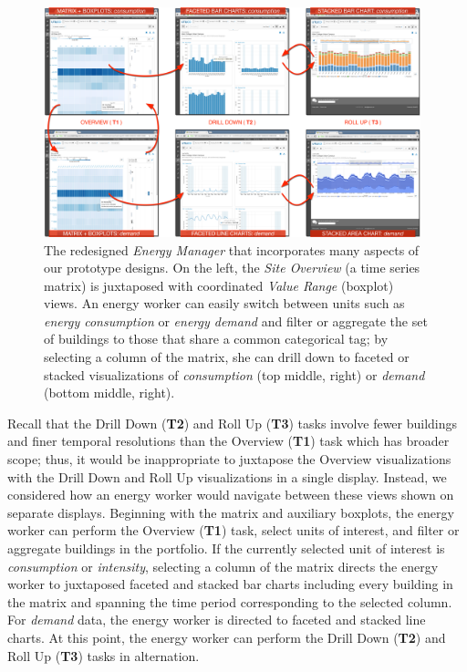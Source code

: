\documentclass[journal]{vgtc}                %
\newcommand{\bstart}[1]{\vspace{1mm} \noindent{\textbf{#1:}}}
\begin{document}
\begin{figure}[hbp!]
    \vspace{-0.45cm}
	\centering
	\includegraphics[width=0.975\textwidth]{figures/emu.pdf}
	\vspace{-0.3cm}
	\caption{The redesigned \textsl{Energy Manager} that incorporates many aspects of our prototype designs. On the left, the \textsl{Site Overview} (a time series matrix) is juxtaposed with coordinated \textsl{Value Range} (boxplot) views. An energy worker can easily switch between units such as \textsl{energy consumption} or \textsl{energy demand} and filter or aggregate the set of buildings to those that share a common categorical tag; by selecting a column of the matrix, she can drill down to faceted or stacked visualizations of \textsl{consumption} (top middle, right) or \textsl{demand} (bottom middle, right).}
	\label{fig:emu}
\end{figure} 

\bstart{Sequenced view navigation}
Recall that the Drill Down ({\bf T2}) and Roll Up ({\bf T3}) tasks involve fewer buildings and finer temporal resolutions than the Overview ({\bf T1}) task which has broader scope; 
thus, it would be inappropriate to juxtapose the Overview visualizations with the Drill Down and Roll Up  visualizations in a single display.
Instead, we considered how an energy worker would navigate between these views shown on separate displays.
Beginning with the matrix and auxiliary boxplots, the energy worker can perform the Overview ({\bf T1}) task, select units of interest, and filter or aggregate buildings in the portfolio. 
If the currently selected unit of interest is {\it consumption} or {\it intensity}, selecting a column of the matrix directs the energy worker to juxtaposed faceted and stacked bar charts including every building in the matrix and spanning the time period corresponding to the selected column. 
For {\it demand} data, the energy worker is directed to faceted and stacked line charts.
At this point, the energy worker can perform the Drill Down ({\bf T2}) and Roll Up ({\bf T3}) tasks in alternation.
\end{document}
